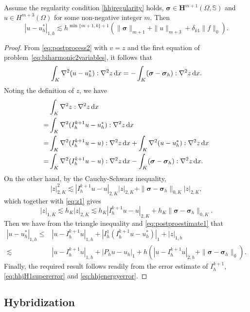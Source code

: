 \begin{theorem}\label{thm:uuhstar1}
Assume the regularity condition \eqref{hhjregularity} holds, $\boldsymbol{\sigma}\in \boldsymbol{H}^{m+1}(\Omega, \mathbb{S})$ and $u\in H^{m+3}(\Omega)$ for
some non-negative integer $m$. Then
\[
|u-u_h^{\ast}|_{1,h}\lesssim h^{\min\{m+1,k\}+1}(\|\boldsymbol{\sigma}\|_{m+1}+\|u\|_{m+3}+\delta_{k1}\|f\|_0).
\]
\end{theorem}
\begin{proof}
From \eqref{eq:postprocess2} with $v=z$ and the first equation of problem~\eqref{eq:biharmonic2variables}, it follows that
\[
\int_K\nabla^2(u-u_h^{\ast}):\nabla^2z\,{\rm d}x=-\int_K(\boldsymbol{\sigma}-\boldsymbol{\sigma}_h):\nabla^2z\,{\rm d}x.
\]
Noting the definition of $z$, we have
\begin{align*}
&\int_K\nabla^2z:\nabla^2z\,{\rm d}x \\
=&\int_K\nabla^2(I_h^{k+1}u-u_h^{\ast}):\nabla^2z\,{\rm d}x \\
=&\int_K\nabla^2(I_h^{k+1}u-u):\nabla^2z\,{\rm d}x+\int_K\nabla^2(u-u_h^{\ast}):\nabla^2z\,{\rm d}x \\
=&\int_K\nabla^2(I_h^{k+1}u-u):\nabla^2z\,{\rm d}x-\int_K(\boldsymbol{\sigma}-\boldsymbol{\sigma}_h):\nabla^2z\,{\rm d}x.
\end{align*}
On the other hand, by the Cauchy-Schwarz inequality,
\[
|z|_{2,K}^2\lesssim  |I_h^{k+1}u-u|_{2,K}|z|_{2,K} + \|\boldsymbol{\sigma}-\boldsymbol{\sigma}_h\|_{0,K}|z|_{2,K},
\]
which together with \eqref{eq:z1} gives
\[
|z|_{1,K}\lesssim h_K|z|_{2,K}\lesssim h_K|I_h^{k+1}u-u|_{2,K} + h_K\|\boldsymbol{\sigma}-\boldsymbol{\sigma}_h\|_{0,K}.
\]
Then we have from the triangle inequality and \eqref{eq:postproestimate1} that
\begin{align*}
|u-u_h^{\ast}|_{1,h}\leq & |u-I_h^{k+1}u|_{1,h}+|I_h^1(I_h^{k+1}u-u_h^{\ast})|_{1} +|z|_{1,h} \\
\lesssim & |u-I_h^{k+1}u|_{1,h} + |P_hu-u_h|_{1} + h(|u-I_h^{k+1}u|_{2,h}+\|\boldsymbol{\sigma}-\boldsymbol{\sigma}_h\|_{0}).
\end{align*}
Finally, the required result follows readily from the error estimate of $I_h^{k+1}$, \eqref{eq:hhjH1supererror} and \eqref{eq:hhjenergyerror}.
\end{proof}


\subsection{Hybridization}

